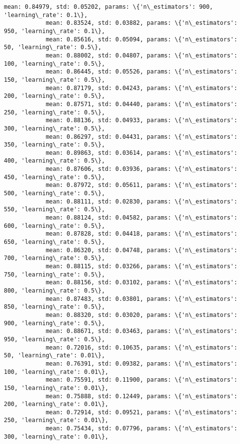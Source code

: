 \documentclass{article}
\begin{document}
\begin{Verbatim}[commandchars=\\\{\}]
            mean: 0.84979, std: 0.05202, params: \{'n\_estimators': 900, 'learning\_rate': 0.1\},
            mean: 0.83524, std: 0.03882, params: \{'n\_estimators': 950, 'learning\_rate': 0.1\},
            mean: 0.85616, std: 0.05094, params: \{'n\_estimators': 50, 'learning\_rate': 0.5\},
            mean: 0.88002, std: 0.04807, params: \{'n\_estimators': 100, 'learning\_rate': 0.5\},
            mean: 0.86445, std: 0.05526, params: \{'n\_estimators': 150, 'learning\_rate': 0.5\},
            mean: 0.87179, std: 0.04243, params: \{'n\_estimators': 200, 'learning\_rate': 0.5\},
            mean: 0.87571, std: 0.04440, params: \{'n\_estimators': 250, 'learning\_rate': 0.5\},
            mean: 0.88136, std: 0.04933, params: \{'n\_estimators': 300, 'learning\_rate': 0.5\},
            mean: 0.86297, std: 0.04431, params: \{'n\_estimators': 350, 'learning\_rate': 0.5\},
            mean: 0.89863, std: 0.03614, params: \{'n\_estimators': 400, 'learning\_rate': 0.5\},
            mean: 0.87606, std: 0.03936, params: \{'n\_estimators': 450, 'learning\_rate': 0.5\},
            mean: 0.87972, std: 0.05611, params: \{'n\_estimators': 500, 'learning\_rate': 0.5\},
            mean: 0.88111, std: 0.02830, params: \{'n\_estimators': 550, 'learning\_rate': 0.5\},
            mean: 0.88124, std: 0.04582, params: \{'n\_estimators': 600, 'learning\_rate': 0.5\},
            mean: 0.87828, std: 0.04418, params: \{'n\_estimators': 650, 'learning\_rate': 0.5\},
            mean: 0.86320, std: 0.04748, params: \{'n\_estimators': 700, 'learning\_rate': 0.5\},
            mean: 0.88115, std: 0.03266, params: \{'n\_estimators': 750, 'learning\_rate': 0.5\},
            mean: 0.88156, std: 0.03102, params: \{'n\_estimators': 800, 'learning\_rate': 0.5\},
            mean: 0.87483, std: 0.03801, params: \{'n\_estimators': 850, 'learning\_rate': 0.5\},
            mean: 0.88320, std: 0.03020, params: \{'n\_estimators': 900, 'learning\_rate': 0.5\},
            mean: 0.88671, std: 0.03463, params: \{'n\_estimators': 950, 'learning\_rate': 0.5\},
            mean: 0.72016, std: 0.10635, params: \{'n\_estimators': 50, 'learning\_rate': 0.01\},
            mean: 0.76391, std: 0.09382, params: \{'n\_estimators': 100, 'learning\_rate': 0.01\},
            mean: 0.75591, std: 0.11900, params: \{'n\_estimators': 150, 'learning\_rate': 0.01\},
            mean: 0.75888, std: 0.12449, params: \{'n\_estimators': 200, 'learning\_rate': 0.01\},
            mean: 0.72914, std: 0.09521, params: \{'n\_estimators': 250, 'learning\_rate': 0.01\},
            mean: 0.75434, std: 0.07796, params: \{'n\_estimators': 300, 'learning\_rate': 0.01\},

\end{Verbatim}
\end{document}

